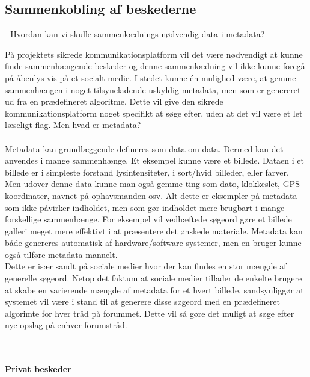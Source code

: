 

\subsection{Sammenkobling af beskederne}
- Hvordan kan vi skulle sammenkædnings nødvendig data i metadata?

På projektets sikrede kommunikationsplatform vil det være nødvendigt at kunne finde sammenhængende beskeder og denne sammenkædning vil ikke kunne foregå på åbenlys vis på et socialt medie. I stedet kunne én mulighed være, at gemme sammenhængen i noget tilsyneladende uskyldig metadata, men som er genereret ud fra en prædefineret algoritme. Dette vil give den sikrede kommunikationsplatform noget specifikt at søge efter, uden at det vil være et let læseligt flag. Men hvad er metadata?\\\\
Metadata kan grundlæggende defineres som data om data. Dermed kan det anvendes i mange sammenhænge. Et eksempel kunne være et billede. Dataen i et billede er i simpleste forstand lysintensiteter, i sort/hvid billeder, eller farver. Men udover denne data kunne man også gemme ting som dato, klokkeslet, GPS koordinater, navnet på ophavsmanden osv. Alt dette er eksempler på metadata som ikke påvirker indholdet, men som gør indholdet mere brugbart i mange forskellige sammenhænge. For eksempel vil vedhæftede søgeord gøre et billede galleri meget mere effektivt i at præsentere det ønskede materiale. Metadata kan både genereres automatisk af hardware/software systemer, men en bruger kunne også tilføre metadata manuelt.\\ Dette er især sandt på sociale medier hvor der kan findes en stor mængde af generelle søgeord. Netop det faktum at sociale medier tillader de enkelte brugere at skabe en varierende mængde af metadata for et hvert billede, sandsynliggør at systemet vil være i stand til at generere disse søgeord med en prædefineret algorimte for hver tråd på forummet. Dette vil så gøre det muligt at søge efter nye opslag på enhver forumstråd.

\\\\
\textbf{Privat beskeder}\\


